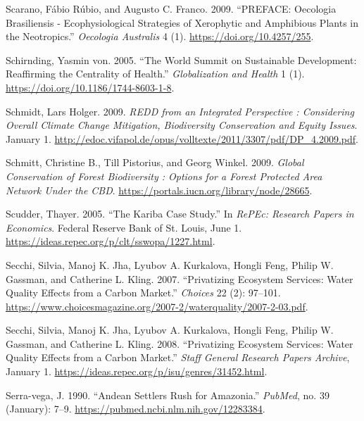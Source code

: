 \begin{CSLReferences}{1}{1}
Scarano, Fábio Rúbio, and Augusto C. Franco. 2009. {``PREFACE: Oecologia
Brasiliensis - Ecophysiological Strategies of Xerophytic and Amphibious
Plants in the Neotropics.''} \emph{Oecologia Australis} 4 (1).
\url{https://doi.org/10.4257/255}.

Schirnding, Yasmin von. 2005. {``The World Summit on Sustainable
Development: Reaffirming the Centrality of Health.''}
\emph{Globalization and Health} 1 (1).
\url{https://doi.org/10.1186/1744-8603-1-8}.

Schmidt, Lars Holger. 2009. \emph{REDD from an Integrated Perspective :
Considering Overall Climate Change Mitigation, Biodiversity Conservation
and Equity Issues}. January 1.
\url{http://edoc.vifapol.de/opus/volltexte/2011/3307/pdf/DP_4.2009.pdf}.

Schmitt, Christine B., Till Pistorius, and Georg Winkel. 2009.
\emph{Global Conservation of Forest Biodiversity : Options for a Forest
Protected Area Network Under the CBD}.
\url{https://portals.iucn.org/library/node/28665}.

Scudder, Thayer. 2005. {``The Kariba Case Study.''} In \emph{RePEc:
Research Papers in Economics}. Federal Reserve Bank of St. Louis, June
1. \url{https://ideas.repec.org/p/clt/sswopa/1227.html}.

Secchi, Silvia, Manoj K. Jha, Lyubov A. Kurkalova, Hongli Feng, Philip
W. Gassman, and Catherine L. Kling. 2007. {``Privatizing Ecosystem
Services: Water Quality Effects from a Carbon Market.''} \emph{Choices}
22 (2): 97--101.
\url{https://www.choicesmagazine.org/2007-2/waterquality/2007-2-03.pdf}.

Secchi, Silvia, Manoj K. Jha, Lyubov A. Kurkalova, Hongli Feng, Philip
W. Gassman, and Catherine L. Kling. 2008. {``Privatizing Ecosystem
Services: Water Quality Effects from a Carbon Market.''} \emph{Staff
General Research Papers Archive}, January 1.
\url{https://ideas.repec.org/p/isu/genres/31452.html}.

Serra-vega, J. 1990. {``Andean Settlers Rush for Amazonia.''}
\emph{PubMed}, no. 39 (January): 7--9.
\url{https://pubmed.ncbi.nlm.nih.gov/12283384}.


\end{CSLReferences}
